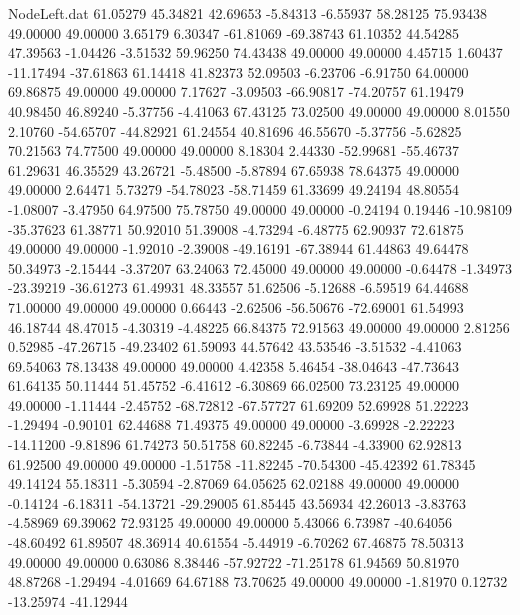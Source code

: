 \begin{filecontents}{NodeLeft.dat}
  61.05279   45.34821   42.69653    -5.84313   -6.55937   58.28125   75.93438   49.00000   49.00000    3.65179    6.30347  -61.81069  -69.38743
  61.10352   44.54285   47.39563    -1.04426   -3.51532   59.96250   74.43438   49.00000   49.00000    4.45715    1.60437  -11.17494  -37.61863
  61.14418   41.82373   52.09503    -6.23706   -6.91750   64.00000   69.86875   49.00000   49.00000    7.17627   -3.09503  -66.90817  -74.20757
  61.19479   40.98450   46.89240    -5.37756   -4.41063   67.43125   73.02500   49.00000   49.00000    8.01550    2.10760  -54.65707  -44.82921
  61.24554   40.81696   46.55670    -5.37756   -5.62825   70.21563   74.77500   49.00000   49.00000    8.18304    2.44330  -52.99681  -55.46737
  61.29631   46.35529   43.26721    -5.48500   -5.87894   67.65938   78.64375   49.00000   49.00000    2.64471    5.73279  -54.78023  -58.71459
  61.33699   49.24194   48.80554    -1.08007   -3.47950   64.97500   75.78750   49.00000   49.00000   -0.24194    0.19446  -10.98109  -35.37623
  61.38771   50.92010   51.39008    -4.73294   -6.48775   62.90937   72.61875   49.00000   49.00000   -1.92010   -2.39008  -49.16191  -67.38944
  61.44863   49.64478   50.34973    -2.15444   -3.37207   63.24063   72.45000   49.00000   49.00000   -0.64478   -1.34973  -23.39219  -36.61273
  61.49931   48.33557   51.62506    -5.12688   -6.59519   64.44688   71.00000   49.00000   49.00000    0.66443   -2.62506  -56.50676  -72.69001
  61.54993   46.18744   48.47015    -4.30319   -4.48225   66.84375   72.91563   49.00000   49.00000    2.81256    0.52985  -47.26715  -49.23402
  61.59093   44.57642   43.53546    -3.51532   -4.41063   69.54063   78.13438   49.00000   49.00000    4.42358    5.46454  -38.04643  -47.73643
  61.64135   50.11444   51.45752    -6.41612   -6.30869   66.02500   73.23125   49.00000   49.00000   -1.11444   -2.45752  -68.72812  -67.57727
  61.69209   52.69928   51.22223    -1.29494   -0.90101   62.44688   71.49375   49.00000   49.00000   -3.69928   -2.22223  -14.11200   -9.81896
  61.74273   50.51758   60.82245    -6.73844   -4.33900   62.92813   61.92500   49.00000   49.00000   -1.51758  -11.82245  -70.54300  -45.42392
  61.78345   49.14124   55.18311    -5.30594   -2.87069   64.05625   62.02188   49.00000   49.00000   -0.14124   -6.18311  -54.13721  -29.29005
  61.85445   43.56934   42.26013    -3.83763   -4.58969   69.39062   72.93125   49.00000   49.00000    5.43066    6.73987  -40.64056  -48.60492
  61.89507   48.36914   40.61554    -5.44919   -6.70262   67.46875   78.50313   49.00000   49.00000    0.63086    8.38446  -57.92722  -71.25178
  61.94569   50.81970   48.87268    -1.29494   -4.01669   64.67188   73.70625   49.00000   49.00000   -1.81970    0.12732  -13.25974  -41.12944

\end{filecontents}
